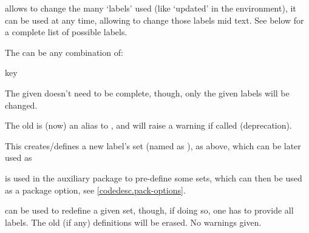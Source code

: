 \documentclass{article}
\begin{document}
\begin{codedescribe}[code,new=2025/11/22]{\setcodelabels}\label{labelset}
\begin{codesyntax} %
\end{codesyntax}
\tsobj{\setcodelabels} allows to change the many `labels' used (like `updated' in the  environment), it can be used at any time, allowing to change those labels mid text. See below for a complete list of possible labels.
\end{codedescribe}

The  can be any combination of:
\begin{describelist*}{key}
\end{describelist*}

\begin{tsremark}
  The given  doesn't need to be complete, though, only the given labels will be changed.
\end{tsremark}
\begin{tsremark}
  The old  is (now) an alias to , and will raise a warning if called (deprecation).
\end{tsremark}



\begin{codedescribe}[code,new=2025/11/22]{\newlabelset}
\begin{codesyntax} %
\end{codesyntax}
This creates/defines a new label's set (named as ),  as above, which can be later used as 
\end{codedescribe}
\begin{tsremark}
  \tsobj{\newlabelset} is used in the  auxiliary package  to pre-define some sets, which can then be used as a package option, see \ref{codedesc.pack-options}.
\end{tsremark}
\begin{tsremark}
  \tsobj{\newlabelset} can be used to redefine a given set, though, if doing so, one has to provide all labels. The old (if any) definitions will be erased. No warnings given.
\end{tsremark}
\end{document}
